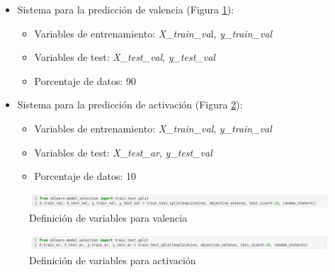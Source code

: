\documentclass[12pt,a4paper,Spanish]{article}
\begin{document}
\begin{itemize}
	\item Sistema para la predicción de valencia (Figura \ref{fig:splitvalence}):
	\begin{itemize}
		\item Variables de entrenamiento: \textit{X\_train\_va}l, \textit{y\_train\_val}
		\item Variables de test: \textit{X\_test\_val}, \textit{y\_test\_val}
		\item Porcentaje de datos: 90
	\end{itemize}
	\item Sistema para la predicción de activación (Figura \ref{fig:splitarousal}):
	\begin{itemize}
		\item Variables de entrenamiento: \textit{X\_train\_val}, \textit{y\_train\_val}
		\item Variables de test: \textit{X\_test\_ar}, \textit{y\_test\_val}
		\item Porcentaje de datos: 10
	\end{itemize}

\end{itemize}

\begin{figure}[H]
	\centering
	\includegraphics[width=1\linewidth]{figs/split_valence}
	\caption{Definición de variables para valencia}
	\label{fig:splitvalence}
\end{figure}
\begin{figure}[H]
	\centering
	\includegraphics[width=1\linewidth]{figs/split_arousal}
	\caption{Definición de variables para activación}
	\label{fig:splitarousal}
\end{figure}
\end{document}
